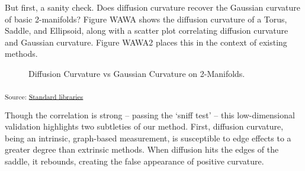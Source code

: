 \documentclass[
  letterpaper,
  DIV=11,
  numbers=noendperiod]{scrartcl}
\begin{document}
But first, a sanity check. Does diffusion curvature recover the Gaussian
curvature of basic 2-manifolds? Figure WAWA shows the diffusion
curvature of a Torus, Saddle, and Ellipsoid, along with a scatter plot
correlating diffusion curvature and Gaussian curvature. Figure WAWA2
places this in the context of existing methods.

\begin{figure}[H]


\caption{\label{fig-2-manifolds}Diffusion Curvature vs Gaussian
Curvature on 2-Manifolds.}

\end{figure}%

\textsubscript{Source:
\href{https://professorwug.github.io/diffusion-curvature//home/piriac/Pumberton/Workshop/21-SUMRY-Curvature/diffusion-curvature/nbs/experiments/2a-Toy-Manifolds.ipynb.html\#cell-fig-2-manifolds}{Standard
libraries}}

Though the correlation is strong -- passing the `sniff test' -- this
low-dimensional validation highlights two subtleties of our method.
First, diffusion curvature, being an intrinsic, graph-based measurement,
is susceptible to edge effects to a greater degree than extrinsic
methods. When diffusion hits the edges of the saddle, it rebounds,
creating the false appearance of positive curvature.
\end{document}
